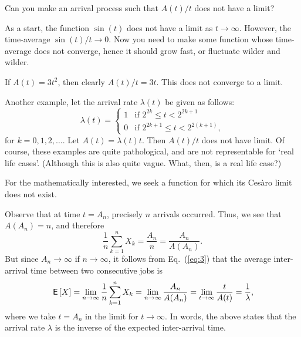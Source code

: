 \begin{extra}
  Can you make an arrival process such that $A(t)/t$ does not have a
  limit?  
  \begin{hint}
As a start, the function $\sin(t)$ does not have a limit as
    $t\to\infty$. However, the time-average $\sin(t)/t \to 0$.  Now
    you need to make some function whose time-average does not
    converge, hence it should grow fast, or fluctuate wilder and
    wilder.
  \end{hint}
  \begin{solution}
 If $A(t) = 3 t^2$, then clearly $A(t)/t = 3t$. This does not
    converge to a limit. 

  Another example, let the arrival rate $\lambda(t)$ be given as
    follows:
    \begin{equation*}
      \lambda(t) = 
    \begin{cases}
      1 & \text{if } 2^{2k} \leq t < 2^{2k+1} \\
      0 & \text{if } 2^{2k+1} \leq t < 2^{2(k+1)},
    \end{cases}
    \end{equation*}
    for $k=0,1,2,\ldots$. Let $A(t) = \lambda(t) t$. Then $A(t)/t$
    does not have limit. Of course, these examples are quite
    pathological, and are not representable for `real life cases'.
    (Although this is also quite vague. What, then, is a real life
    case?)

For the mathematically interested, we seek a
    function for which its Ces\`aro limit does not exist.
  \end{solution}
\end{extra}



Observe that at time $t=A_n$, precisely $n$ arrivals occurred.
Thus,
we see that $A(A_n) = n$, and therefore
\begin{equation*}
  \frac{1}n\sum_{k=1}^n X_k = \frac{A_n}n = \frac{A_n}{A(A_n)}. 
\end{equation*}
But since $A_n\to\infty$ if $n\to\infty$, it follows from Eq.~(\ref{eq:3}) that the average inter-arrival time between two consecutive jobs is
\begin{equation}\label{eq:54}
  \,\mathsf{E}\left[X\right] = \lim_{n\to\infty}  \frac{1}n\sum_{k=1}^n X_k = \lim_{n\to \infty} \frac{A_n}{A(A_n)} = \lim_{t\to\infty} \frac t{A(t)} = \frac 1 \lambda,
\end{equation}
where we take $t=A_n$ in the limit for $t\to\infty$.
In words, the above states that the arrival rate $\lambda$ is the inverse of the expected inter-arrival time.

